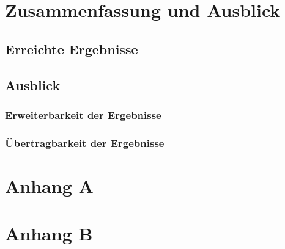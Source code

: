\documentclass[oneside]{ausarbeitung}
\begin{document}
\chapter{Zusammenfassung und Ausblick}
\label{cha:zusammenfassung}

\section{Erreichte Ergebnisse}
\label{sec:ergebnisse}

\section{Ausblick}
\label{sec:ausblick}

\subsection{Erweiterbarkeit der Ergebnisse}
\label{sub:erweiterbarkeit}

\subsection{Übertragbarkeit der Ergebnisse}
\label{sub:uebertragbarkeit}

\appendix

\printbibliography

\chapter{Anhang A}

\chapter{Anhang B}
\end{document}
